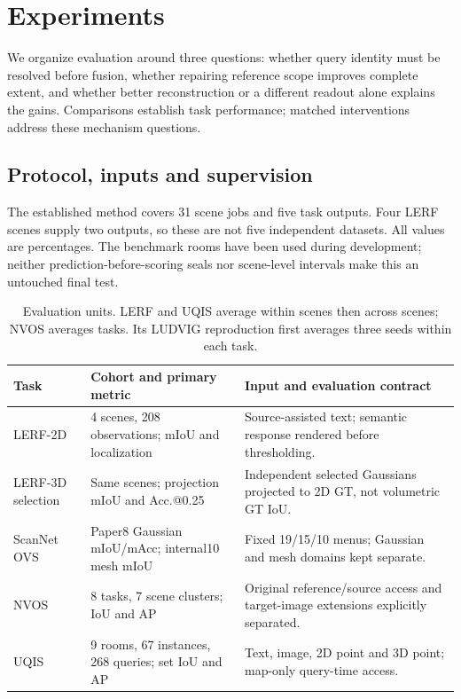 \section{Experiments}
\label{sec:experiments}
We organize evaluation around three questions: whether query identity must be
resolved before fusion, whether repairing reference scope improves complete
extent, and whether better reconstruction or a different readout alone explains
the gains. Comparisons establish task performance; matched interventions address
these mechanism questions.

\subsection{Protocol, inputs and supervision}
The established method covers 31 scene jobs and five task outputs. Four LERF
scenes supply two outputs, so these are not five independent datasets.
All values are percentages. The benchmark rooms have been used during
development; neither prediction-before-scoring seals nor scene-level intervals
make this an untouched final test.
\begin{table}[ht]
\centering\small
\begin{tabular}{lp{.25\linewidth}p{.43\linewidth}}
\toprule
Task & Cohort and primary metric & Input and evaluation contract \\
\midrule
LERF-2D & 4 scenes, 208 observations; mIoU and localization & Source-assisted text; semantic response rendered before thresholding. \\
LERF-3D selection & Same scenes; projection mIoU and Acc.@0.25 & Independent selected Gaussians projected to 2D GT, not volumetric GT IoU. \\
ScanNet OVS & Paper8 Gaussian mIoU/mAcc; internal10 mesh mIoU & Fixed 19/15/10 menus; Gaussian and mesh domains kept separate. \\
NVOS & 8 tasks, 7 scene clusters; IoU and AP & Original reference/source access and target-image extensions explicitly separated. \\
UQIS & 9 rooms, 67 instances, 268 queries; set IoU and AP & Text, image, 2D point and 3D point; map-only query-time access. \\
\bottomrule
\end{tabular}
\caption{Evaluation units. LERF and UQIS average within scenes then across
scenes; NVOS averages tasks. Its LUDVIG reproduction first averages three seeds
within each task.}
\label{tab:protocols}
\end{table}

